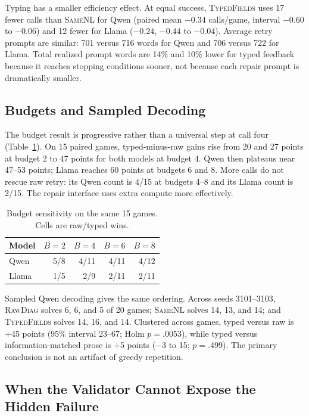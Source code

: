 \documentclass[sigconf,review,anonymous]{acmart}
\newcommand{\rawdiag}{\textsc{RawDiag}\xspace}
\newcommand{\samenl}{\textsc{SameNL}\xspace}
\newcommand{\typedfields}{\textsc{TypedFields}\xspace}
\begin{document}
Typing has a smaller efficiency effect. At equal success, \typedfields uses 17
fewer calls than \samenl for Qwen (paired mean $-0.34$ calls/game, interval
$-0.60$ to $-0.06$) and 12 fewer for Llama ($-0.24$, $-0.44$ to $-0.04$).
Average retry prompts are similar: 701 versus 716 words for Qwen and 706 versus
722 for Llama. Total realized prompt words are 14\% and 10\% lower for typed
feedback because it reaches stopping conditions sooner, not because each repair
prompt is dramatically smaller.

\subsection{Budgets and Sampled Decoding}

The budget result is progressive rather than a universal step at call four
(Table~\ref{tab:budget}). On 15 paired games, typed-minus-raw gains rise from 20
and 27 points at budget 2 to 47 points for both models at budget 4. Qwen then
plateaus near 47--53 points; Llama reaches 60 points at budgets 6 and 8. More
calls do not rescue raw retry: its Qwen count is 4/15 at budgets 4--8 and its
Llama count is 2/15. The repair interface uses extra compute more effectively.

\begin{table}[t]
\caption{Budget sensitivity on the same 15 games. Cells are raw/typed wins.}
\label{tab:budget}
\small
\begin{tabular}{@{}lrrrr@{}}
\toprule
Model & $B=2$ & $B=4$ & $B=6$ & $B=8$ \\
\midrule
Qwen & 5/8 & 4/11 & 4/11 & 4/12 \\
Llama & 1/5 & 2/9 & 2/11 & 2/11 \\
\bottomrule
\end{tabular}
\end{table}

Sampled Qwen decoding gives the same ordering. Across seeds 3101--3103,
\rawdiag solves 6, 6, and 5 of 20 games; \samenl solves 14, 13, and 14; and
\typedfields solves 14, 16, and 14. Clustered across games, typed versus raw is
+45 points (95\% interval 23--67; Holm $p=.0053$), while typed versus
information-matched prose is +5 points ($-3$ to 15; $p=.499$). The primary
conclusion is not an artifact of greedy repetition.

\subsection{When the Validator Cannot Expose the Hidden Failure}
\end{document}
